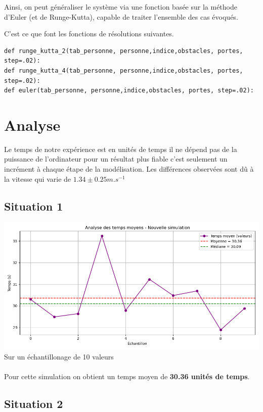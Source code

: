 \documentclass[a4paper,12pt]{article}
\begin{document}
\vspace{1em}

Ainsi, on peut généraliser le système via une fonction basée sur la méthode d’Euler (et de Runge-Kutta), capable de traiter l’ensemble des cas évoqués.

\vspace{1em}

C'est ce que font les fonctions de résolutions suivantes.

\begin{verbatim}
def runge_kutta_2(tab_personne, personne,indice,obstacles, portes, step=.02):
def runge_kutta_4(tab_personne, personne,indice,obstacles, portes, step=.02):
def euler(tab_personne, personne,indice,obstacles, portes, step=.02):
\end{verbatim}


\section{Analyse}
Le temps de notre expérience est en unités de temps il ne dépend pas de la puissance de l'ordinateur pour un résultat plus fiable c'est seulement un incrément à chaque étape de la modélisation. Les différences observées sont dû à la vitesse qui varie de $1.34 \pm 0.25 m.s^{-1}$
\subsection{Situation 1}

\includegraphics[width=\textwidth]{resultat.png} %
Sur un échantillonage de 10 valeurs
\\
\\
Pour cette simulation on obtient un temps moyen de \textbf{30.36 unités de temps}.
\subsection{Situation 2}
\end{document}
